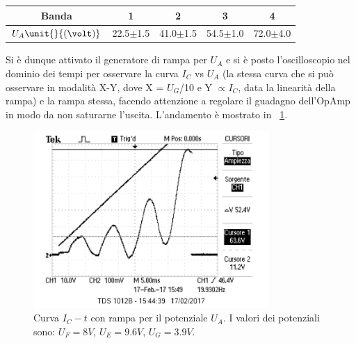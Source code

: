 \documentclass[10pt,a4paper]{article}
\begin{document}
\begin{table}[h!]
\centering
\begin{tabular}{c|c|c|c|c}
\hline
Banda &1&2&3&4\\
\hline 
$U_{A} \unit{}{(\volt)}$ & 22.5$\pm$1.5 & 41.0$\pm$1.5 & 54.5$\pm$1.0 & 72.0$\pm$4.0  \\ 
\hline
\end{tabular}
\label{tab:massimi}
\end{table}




Si è dunque attivato il generatore di rampa per $U_{A}$ e si è posto l'oscilloscopio nel dominio dei tempi per osservare la curva $I_{C}$ vs $U_{A}$ (la stessa curva che si può osservare in modalità X-Y, dove X = $U_{G}$/10 e Y $\propto I_{C}$, data la linearità della rampa) e la rampa stessa, facendo attenzione a regolare il guadagno dell'OpAmp in modo da non saturarne l'uscita. L'andamento è mostrato in \figurename{~\ref{andamento}}.

\begin{figure}[h!]
	\centering
		\includegraphics[width=0.80\textwidth]{../oscilloscopio/correnteanodicatempo1.png}
	\caption{Curva $I_{C} - t$ con rampa per il potenziale $U_{A}$. I valori dei potenziali sono: $U_{F}=\unit{8}{V}$, $U_{E}=\unit{9.6}{V}$, $U_{G}=\unit{3.9}{V}$.}
	\label{andamento}
\end{figure}
\end{document}
